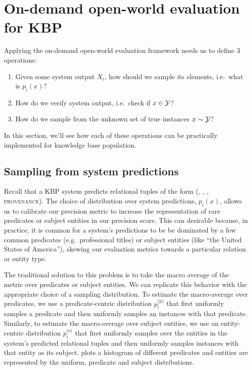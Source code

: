 \section{On-demand open-world evaluation for KBP}
\label{sec:application}
Applying the on-demand open-world evaluation framework needs us to define 3 operations:
\begin{enumerate}
  \item Given some system output $X_i$, how should we sample its elements, i.e.\ what is $p_i(x)$?
  \item How do we verify system output, i.e.\ check if $x \in \mathcal{Y}$?
  \item How do we sample from the unknown set of true instances $x \sim \mathcal{Y}$?
\end{enumerate}
In this section, we'll see how each of these operations can be practically implemented for knowledge base population.

\subsection{Sampling from system predictions}
Recall that a KBP system predicts relational tuples of the form (, , , \textsc{provenance}).
The choice of distribution over system predictions, $p_i(x)$, allows us to calibrate our precision metric to increase the representation of rare predicates or subject entities in our precision score.
This can desirable because, in practice, it is common for a system's predictions to be be dominated by a few common predicates (e.g.\ professional titles) or subject entities (like ``the United States of America''), skewing our evaluation metrics towards a particular relation or entity type.

The traditional solution to this problem is to take the macro average of the metric over predicates or subject entities.
We can replicate this behavior with the appropriate choice of a sampling distribution.
To estimate the macro-average over predicates, we use a predicate-centric distribution $p_i^\text{(p)}$ that first uniformly samples a predicate and then uniformly samples an instances with that predicate.
Similarly, to estimate the macro-average over subject entities, we use an entity-centric distribution $p_i^\text{(e)}$ that first uniformly samples over the entities in the system's predicted relational tuples and then uniformly samples instances with that entity as its subject.
 plots a histogram of different predicates and entities are represented by the uniform, predicate and subject distributions.

